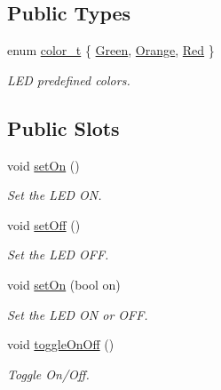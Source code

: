 \subsection*{Public Types}
\begin{DoxyCompactItemize}
\item 
enum \hyperlink{classmdt_led_a2d57d9ef04d2105d2fad93b57fc7cfef}{color\-\_\-t} \{ \hyperlink{classmdt_led_a2d57d9ef04d2105d2fad93b57fc7cfefa45b61a84d67fbd6379dee70b59193415}{Green}, 
\hyperlink{classmdt_led_a2d57d9ef04d2105d2fad93b57fc7cfefa5dc598374ab643ab42ea786bc7fe4a04}{Orange}, 
\hyperlink{classmdt_led_a2d57d9ef04d2105d2fad93b57fc7cfefab889f9da8e6cf657379cb521c3d11406}{Red}
 \}
\begin{DoxyCompactList}\small\item\em L\-E\-D predefined colors. \end{DoxyCompactList}\end{DoxyCompactItemize}
\subsection*{Public Slots}
\begin{DoxyCompactItemize}
\item 
void \hyperlink{classmdt_led_a389ee3e0082ce8fa38cb258944a04892}{set\-On} ()
\begin{DoxyCompactList}\small\item\em Set the L\-E\-D O\-N. \end{DoxyCompactList}\item 
void \hyperlink{classmdt_led_a4c8f5f6aa91b7c90ae6b1aa4933ba6e0}{set\-Off} ()
\begin{DoxyCompactList}\small\item\em Set the L\-E\-D O\-F\-F. \end{DoxyCompactList}\item 
void \hyperlink{classmdt_led_aabbe7fcb23d539946dffec4526c89495}{set\-On} (bool on)
\begin{DoxyCompactList}\small\item\em Set the L\-E\-D O\-N or O\-F\-F. \end{DoxyCompactList}\item 
void \hyperlink{classmdt_led_a9e86ff65f2ec1bfb6131e2b9042609e8}{toggle\-On\-Off} ()
\begin{DoxyCompactList}\small\item\em Toggle On/\-Off. \end{DoxyCompactList}\end{DoxyCompactItemize}
